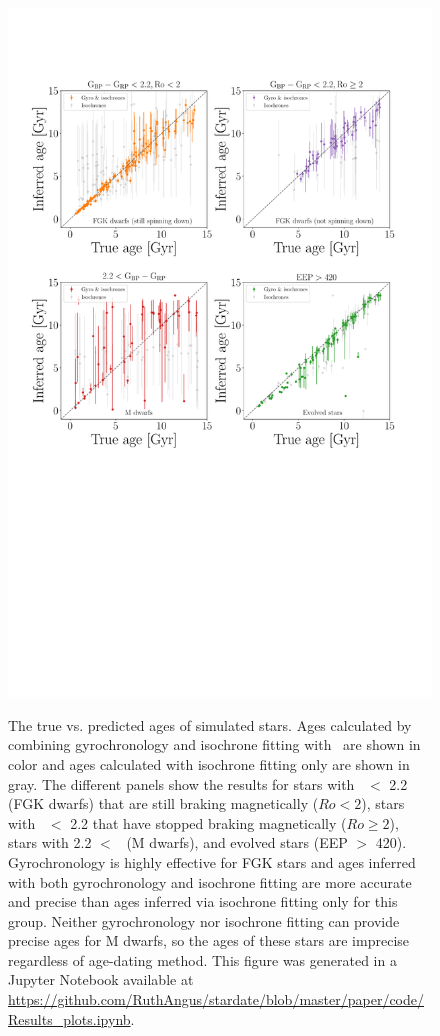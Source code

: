 \begin{figure}
  \caption{
The true vs. predicted ages of simulated stars.
    Ages calculated by combining gyrochronology
    and isochrone fitting with \sd\ are shown in color and ages calculated with
    isochrone fitting only are shown in gray.
The different panels show the results for stars
    with \gcolor\ $<$ 2.2 (FGK dwarfs) that are still braking magnetically
    ($Ro < 2$), stars with \gcolor\ $<$ 2.2 that have stopped braking
    magnetically ($Ro \geq 2$),
    stars with 2.2 $<$ \gcolor\ (M dwarfs), and evolved stars (EEP $>$ 420).
Gyrochronology is highly effective for FGK stars and ages inferred with both
    gyrochronology and isochrone fitting are more accurate and precise than
    ages inferred via isochrone fitting only for this group.
Neither gyrochronology nor isochrone fitting can provide precise ages for
    M dwarfs, so the ages of these stars are imprecise regardless of
    age-dating method.
    This figure was generated in a Jupyter Notebook available at
    \url{https://github.com/RuthAngus/stardate/blob/master/paper/code/Results_plots.ipynb}.
}
  \centering
    \includegraphics[width=1\textwidth]{simulation_results}
\label{fig:simulation_results}
\end{figure}


